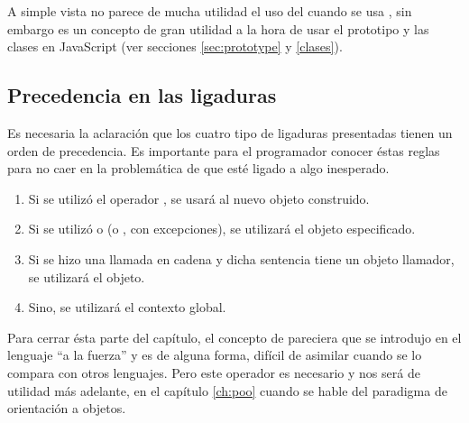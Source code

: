 A simple vista no parece de mucha utilidad el uso del  cuando se usa , sin embargo es un concepto de gran utilidad a la hora de usar el prototipo y las clases en JavaScript (ver secciones \ref{sec:prototype} y \ref{clases}).

\subsection{Precedencia en las ligaduras}

Es necesaria la aclaración que los cuatro tipo de ligaduras presentadas tienen un orden de precedencia. Es importante para el programador conocer éstas reglas para no caer en la problemática de que  esté ligado a algo inesperado.

\begin{enumerate}
\item Si se utilizó el operador , se usará al nuevo objeto construido.
\item Si se utilizó  o  (o , con excepciones), se utilizará el objeto especificado.
\item Si se hizo una llamada en cadena y dicha sentencia tiene un objeto llamador, se utilizará el objeto.
\item Sino, se utilizará el contexto global.
\end{enumerate}

Para cerrar ésta parte del capítulo, el concepto de  pareciera que se introdujo en el lenguaje "`a la fuerza"' y es de alguna forma, difícil de asimilar cuando se lo compara con otros lenguajes. Pero este operador es necesario y nos será de utilidad más adelante, en el capítulo \ref{ch:poo} cuando se hable del paradigma de orientación a objetos.